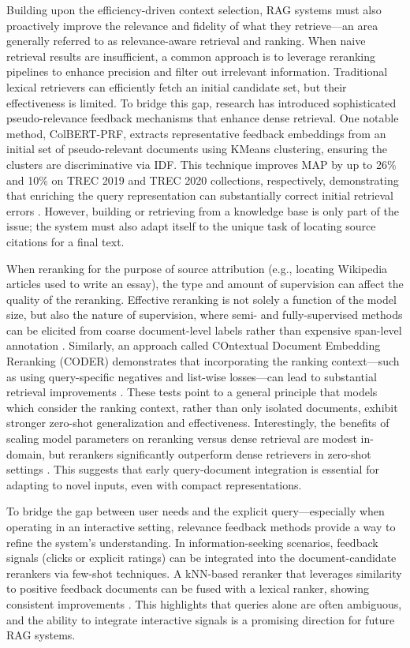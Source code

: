 \documentclass[11pt]{article}
\begin{document}
Building upon the efficiency-driven context selection, RAG systems must also proactively improve the relevance and fidelity of what they retrieve---an area generally referred to as relevance-aware retrieval and ranking. When naive retrieval results are insufficient, a common approach is to leverage reranking pipelines to enhance precision and filter out irrelevant information. Traditional lexical retrievers can efficiently fetch an initial candidate set, but their effectiveness is limited. To bridge this gap, research has introduced sophisticated pseudo-relevance feedback mechanisms that enhance dense retrieval. One notable method, ColBERT-PRF, extracts representative feedback embeddings from an initial set of pseudo-relevant documents using KMeans clustering, ensuring the clusters are discriminative via IDF. This technique improves MAP by up to 26\% and 10\% on TREC 2019 and TREC 2020 collections, respectively, demonstrating that enriching the query representation can substantially correct initial retrieval errors \cite{ref66}. However, building or retrieving from a knowledge base is only part of the issue; the system must also adapt itself to the unique task of locating source citations for a final text.

When reranking for the purpose of source attribution (e.g., locating Wikipedia articles used to write an essay), the type and amount of supervision can affect the quality of the reranking. Effective reranking is not solely a function of the model size, but also the nature of supervision, where semi- and fully-supervised methods can be elicited from coarse document-level labels rather than expensive span-level annotation \cite{ref67}. Similarly, an approach called COntextual Document Embedding Reranking (CODER) demonstrates that incorporating the ranking context---such as using query-specific negatives and list-wise losses---can lead to substantial retrieval improvements \cite{ref68}. These tests point to a general principle that models which consider the ranking context, rather than only isolated documents, exhibit stronger zero-shot generalization and effectiveness. Interestingly, the benefits of scaling model parameters on reranking versus dense retrieval are modest in-domain, but rerankers significantly outperform dense retrievers in zero-shot settings \cite{ref69}. This suggests that early query-document integration is essential for adapting to novel inputs, even with compact representations.

To bridge the gap between user needs and the explicit query---especially when operating in an interactive setting, relevance feedback methods provide a way to refine the system's understanding. In information-seeking scenarios, feedback signals (clicks or explicit ratings) can be integrated into the document-candidate rerankers via few-shot techniques. A kNN-based reranker that leverages similarity to positive feedback documents can be fused with a lexical ranker, showing consistent improvements \cite{ref70}. This highlights that queries alone are often ambiguous, and the ability to integrate interactive signals is a promising direction for future RAG systems.
\end{document}
